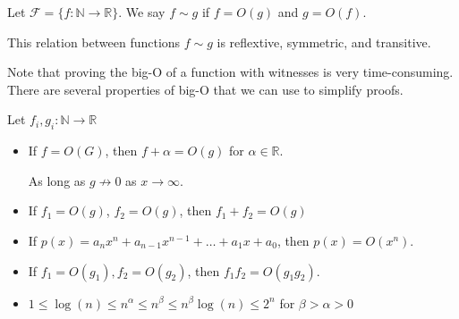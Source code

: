 \documentclass[a4paper]{article}
\begin{document}
\begin{notation}
	Let \( \mathcal{F} = \{f \colon \mathbb{N}\to \mathbb{R}\}   \). We say \( f \sim g \) if \( f = O(g) \) and \( g = O(f) \).
	\begin{note}
		This relation between functions \( f\sim g \) is reflextive, symmetric, and transitive.
	\end{note}
\end{notation}

Note that proving the big-O of a function with witnesses is very time-consuming. There are several properties of big-O that we can use to simplify proofs. 
\begin{property}
	Let \( f_i,g_i \colon \mathbb{N} \to  \mathbb{R}\)
	\begin{itemize}
		\item If \( f = O(G) \), then \( f + \alpha = O(g) \) for \( \alpha \in \mathbb{R} \).
			\begin{note}
				As long as \( g \not\to 0 \) as \( x \to \infty \).
			\end{note}
		\item If \( f_{1}=O(g)\), \( f_{2} = O(g) \), then \( f_{1} + f_{2} = O(g) \)
		\item If \(	p(x) = a_n x^n + a_{n-1}x^{n-1} + \ldots + a_1 x + a_0 \), then \( p(x) = O(x^n) \).
		\item If \( f_{1}=O(g_{1}), f_{2}=O(g_{2}) \), then \( f_{1}f_{2} = O(g_{1}g_{2}) \).
		\item \( 1 \le  \log (n) \le  n^{\alpha} \le n^{\beta} \le n^{\beta}\log (n) \le 2^n \) for \( \beta > \alpha > 0 \)
	\end{itemize}
\end{property}
\end{document}
